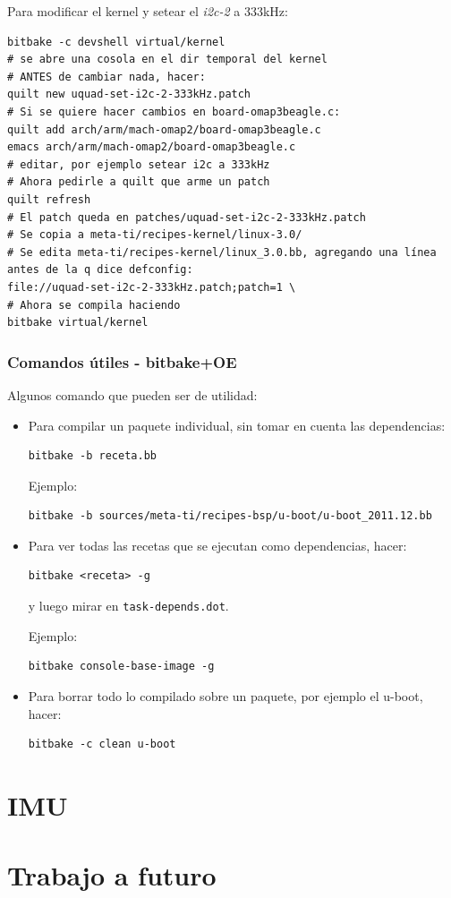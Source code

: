 \documentclass[main]{subfiles}
\begin{document}
Para modificar el kernel y setear el \textit{i2c-2} a 333kHz:

\begin{verbatim}
bitbake -c devshell virtual/kernel
# se abre una cosola en el dir temporal del kernel
# ANTES de cambiar nada, hacer:
quilt new uquad-set-i2c-2-333kHz.patch
# Si se quiere hacer cambios en board-omap3beagle.c:
quilt add arch/arm/mach-omap2/board-omap3beagle.c
emacs arch/arm/mach-omap2/board-omap3beagle.c
# editar, por ejemplo setear i2c a 333kHz
# Ahora pedirle a quilt que arme un patch
quilt refresh
# El patch queda en patches/uquad-set-i2c-2-333kHz.patch
# Se copia a meta-ti/recipes-kernel/linux-3.0/
# Se edita meta-ti/recipes-kernel/linux_3.0.bb, agregando una línea antes de la q dice defconfig:
file://uquad-set-i2c-2-333kHz.patch;patch=1 \
# Ahora se compila haciendo
bitbake virtual/kernel
\end{verbatim}

\subsubsection{Comandos útiles - bitbake+OE}
\label{sec:codigo:comandos-bitbake-oe}

Algunos comando que pueden ser de utilidad:

\begin{itemize}
\item Para compilar un paquete individual, sin tomar en cuenta las dependencias:
\begin{verbatim}
bitbake -b receta.bb
\end{verbatim}
Ejemplo:
\begin{verbatim}
bitbake -b sources/meta-ti/recipes-bsp/u-boot/u-boot_2011.12.bb
\end{verbatim}
\item Para ver todas las recetas que se ejecutan como dependencias, hacer:
\begin{verbatim}
bitbake <receta> -g
\end{verbatim}
y luego mirar en \verb+task-depends.dot+.

Ejemplo:
\begin{verbatim}
bitbake console-base-image -g
\end{verbatim}
\item Para borrar todo lo compilado sobre un paquete, por ejemplo el u-boot, hacer:
\begin{verbatim}
bitbake -c clean u-boot
\end{verbatim}
\end{itemize}

\section{IMU}
\label{sec:codigo:imu}


\section{Trabajo a futuro}
\label{sec:codigo:trabajo-a-futuro}

\end{document}
